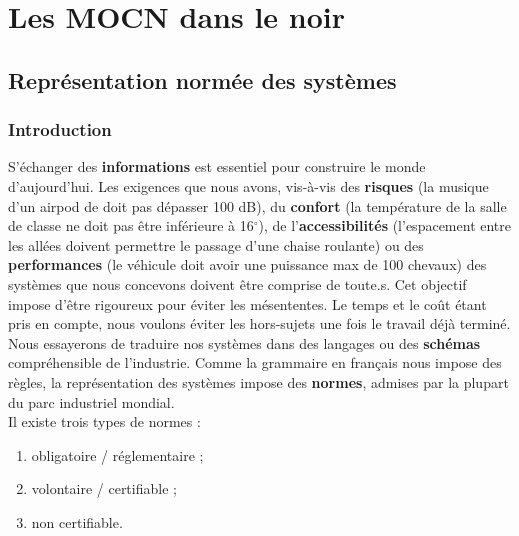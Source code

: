 \documentclass[
	11pt, %
	fleqn, %
	a4paper, %
]{LegrandOrangeBook}
\begin{document}


\part{Les MOCN dans le noir}


\chapter{Représentation normée des systèmes}

\section{Introduction}


S’échanger des \textbf{informations} est essentiel pour construire le monde d’aujourd’hui. Les exigences que nous avons, vis-à-vis des \textbf{risques} (la musique d'un airpod de doit pas dépasser 100 dB), du \textbf{confort} (la température de la salle de classe ne doit pas être inférieure à 16$^{\circ}$), de l'\textbf{accessibilités} (l'espacement entre les allées doivent permettre le passage d'une chaise roulante) ou des \textbf{performances} (le véhicule doit avoir une puissance max de 100 chevaux) des systèmes que nous concevons doivent être comprise de toute.s. Cet objectif impose d’être rigoureux pour éviter les mésententes. Le temps et le coût étant pris en compte, nous voulons éviter les hors-sujets une fois le travail déjà terminé. Nous essayerons de traduire nos systèmes dans des langages ou des \textbf{schémas} compréhensible de l’industrie. Comme la grammaire en français nous impose des règles, la représentation des systèmes impose des \textbf{normes}, admises par la plupart du parc industriel mondial.\\


Il existe trois types de normes :
\begin{enumerate}
    \item obligatoire / réglementaire ;
    \item volontaire / certifiable ;
    \item non certifiable.
\end{enumerate}
\end{document}
